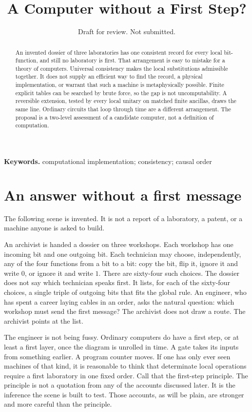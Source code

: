 \documentclass[11pt]{article}
\title{A Computer without a First Step?}
\author{}
\date{Draft for review. Not submitted.}
\begin{document}
\maketitle

\begin{abstract}
An invented dossier of three laboratories has one consistent record for every local bit-function, and still no laboratory is first. That arrangement is easy to mistake for a theory of computers. Universal consistency makes the local substitutions admissible together. It does not supply an efficient way to find the record, a physical implementation, or warrant that such a machine is metaphysically possible. Finite explicit tables can be searched by brute force, so the gap is not uncomputability. A reversible extension, tested by every local unitary on matched finite ancillas, draws the same line. Ordinary circuits that loop through time are a different arrangement. The proposal is a two-level assessment of a candidate computer, not a definition of computation.
\end{abstract}

\noindent\textbf{Keywords.} computational implementation; consistency; causal order

\section{An answer without a first message}
\label{sec:open}

The following scene is invented. It is not a report of a laboratory, a patent, or a machine anyone is asked to build.

An archivist is handed a dossier on three workshops. Each workshop has one incoming bit and one outgoing bit. Each technician may choose, independently, any of the four functions from a bit to a bit: copy the bit, flip it, ignore it and write \(0\), or ignore it and write \(1\). There are sixty-four such choices. The dossier does not say which technician speaks first. It lists, for each of the sixty-four choices, a single triple of outgoing bits that fits the global rule. An engineer, who has spent a career laying cables in an order, asks the natural question: which workshop must send the first message? The archivist does not draw a route. The archivist points at the list.

The engineer is not being fussy. Ordinary computers do have a first step, or at least a first layer, once the diagram is unrolled in time. A gate takes its inputs from something earlier. A program counter moves. If one has only ever seen machines of that kind, it is reasonable to think that determinate local operations require a first laboratory in one fixed order. Call that the first-step principle. The principle is not a quotation from any of the accounts discussed later. It is the inference the scene is built to test. Those accounts, as will be plain, are stronger and more careful than the principle.
\end{document}

